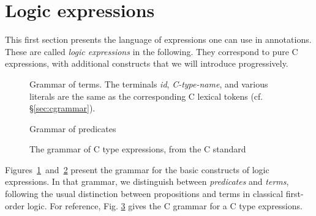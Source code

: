 
\section{Logic expressions}
\label{sec:expressions}

This first section presents the language of expressions one can use in
annotations. These are called \emph{logic expressions} in the following. They
correspond to pure C expressions, with additional constructs
that we will introduce progressively.

\begin{figure}[htp]
  \begin{cadre}
    
  \end{cadre}
  \caption{Grammar of terms. The terminals \emph{id}, \emph{C-type-name}, and various literals are
  	the same as the corresponding C lexical tokens (cf. \S\ref{sec:cgrammar}).}
\label{fig:gram:term}
\end{figure}

\begin{figure}[htp]
  \begin{cadre}
    
  \end{cadre}
  \caption{Grammar of predicates}
\label{fig:gram:pred}
\end{figure}

\begin{figure}[htp]
  \begin{cadre}
    
  \end{cadre}
  \caption{The grammar of C type expressions, from the C standard}
\label{fig:gram:ctype}
\end{figure}

Figures~\ref{fig:gram:term}~and~\ref{fig:gram:pred} present the
grammar for the basic constructs of logic expressions. In that
grammar, we distinguish between \emph{predicates} and
\emph{terms}, following the usual distinction between
propositions and terms in classical first-order logic.
For reference, Fig. \ref{fig:gram:ctype} gives the C grammar for a C type expressions.


